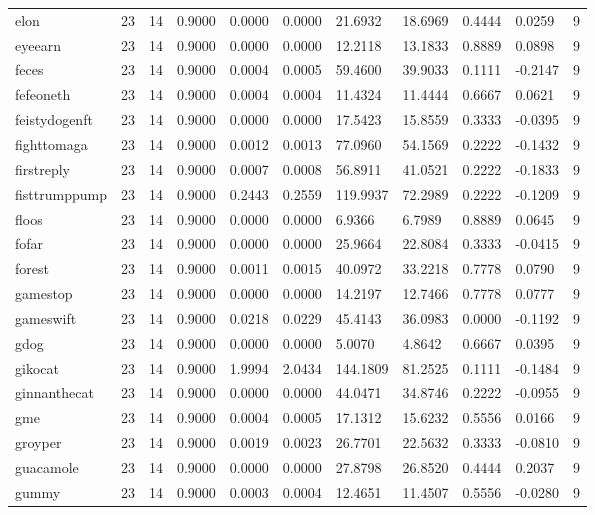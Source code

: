 \begin{table}[htbp]
\begin{tabular}{lllllllllll}
elon & 23 & 14 & 0.9000 & 0.0000 & 0.0000 & 21.6932 & 18.6969 & 0.4444 & 0.0259 & 9 \\
eyeearn & 23 & 14 & 0.9000 & 0.0000 & 0.0000 & 12.2118 & 13.1833 & 0.8889 & 0.0898 & 9 \\
feces & 23 & 14 & 0.9000 & 0.0004 & 0.0005 & 59.4600 & 39.9033 & 0.1111 & -0.2147 & 9 \\
fefeoneth & 23 & 14 & 0.9000 & 0.0004 & 0.0004 & 11.4324 & 11.4444 & 0.6667 & 0.0621 & 9 \\
feistydogenft & 23 & 14 & 0.9000 & 0.0000 & 0.0000 & 17.5423 & 15.8559 & 0.3333 & -0.0395 & 9 \\
fighttomaga & 23 & 14 & 0.9000 & 0.0012 & 0.0013 & 77.0960 & 54.1569 & 0.2222 & -0.1432 & 9 \\
firstreply & 23 & 14 & 0.9000 & 0.0007 & 0.0008 & 56.8911 & 41.0521 & 0.2222 & -0.1833 & 9 \\
fisttrumppump & 23 & 14 & 0.9000 & 0.2443 & 0.2559 & 119.9937 & 72.2989 & 0.2222 & -0.1209 & 9 \\
floos & 23 & 14 & 0.9000 & 0.0000 & 0.0000 & 6.9366 & 6.7989 & 0.8889 & 0.0645 & 9 \\
fofar & 23 & 14 & 0.9000 & 0.0000 & 0.0000 & 25.9664 & 22.8084 & 0.3333 & -0.0415 & 9 \\
forest & 23 & 14 & 0.9000 & 0.0011 & 0.0015 & 40.0972 & 33.2218 & 0.7778 & 0.0790 & 9 \\
gamestop & 23 & 14 & 0.9000 & 0.0000 & 0.0000 & 14.2197 & 12.7466 & 0.7778 & 0.0777 & 9 \\
gameswift & 23 & 14 & 0.9000 & 0.0218 & 0.0229 & 45.4143 & 36.0983 & 0.0000 & -0.1192 & 9 \\
gdog & 23 & 14 & 0.9000 & 0.0000 & 0.0000 & 5.0070 & 4.8642 & 0.6667 & 0.0395 & 9 \\
gikocat & 23 & 14 & 0.9000 & 1.9994 & 2.0434 & 144.1809 & 81.2525 & 0.1111 & -0.1484 & 9 \\
ginnanthecat & 23 & 14 & 0.9000 & 0.0000 & 0.0000 & 44.0471 & 34.8746 & 0.2222 & -0.0955 & 9 \\
gme & 23 & 14 & 0.9000 & 0.0004 & 0.0005 & 17.1312 & 15.6232 & 0.5556 & 0.0166 & 9 \\
groyper & 23 & 14 & 0.9000 & 0.0019 & 0.0023 & 26.7701 & 22.5632 & 0.3333 & -0.0810 & 9 \\
guacamole & 23 & 14 & 0.9000 & 0.0000 & 0.0000 & 27.8798 & 26.8520 & 0.4444 & 0.2037 & 9 \\
gummy & 23 & 14 & 0.9000 & 0.0003 & 0.0004 & 12.4651 & 11.4507 & 0.5556 & -0.0280 & 9 \\

\end{tabular}
\end{table}
